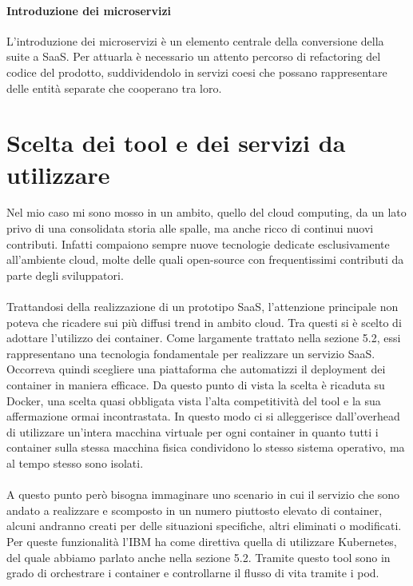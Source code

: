 \paragraph{Introduzione dei microservizi}
L'introduzione dei microservizi è un elemento centrale della conversione della suite a SaaS. Per attuarla è necessario un attento percorso di refactoring del codice del prodotto, suddividendolo in servizi coesi che possano rappresentare delle entità separate che cooperano tra loro.

\section{Scelta dei tool e dei servizi da utilizzare}
Nel mio caso mi sono mosso in un ambito, quello del cloud computing, da un lato privo di una consolidata storia alle spalle, ma anche ricco di continui nuovi contributi. Infatti compaiono sempre nuove tecnologie dedicate esclusivamente all'ambiente cloud, molte delle quali open-source con frequentissimi contributi da parte degli sviluppatori.

\paragraph{}
Trattandosi della realizzazione di un prototipo SaaS, l'attenzione principale non poteva che ricadere sui più diffusi trend in ambito cloud. Tra questi si è scelto di adottare l'utilizzo dei container. Come largamente trattato nella sezione 5.2, essi rappresentano una tecnologia fondamentale per realizzare un servizio SaaS. Occorreva quindi scegliere una piattaforma che automatizzi il deployment dei container in maniera efficace. Da questo punto di vista la scelta è ricaduta su Docker, una scelta quasi obbligata vista l'alta competitività del tool e la sua affermazione ormai incontrastata. In questo modo ci si alleggerisce dall'overhead di utilizzare un'intera macchina virtuale per ogni container in quanto tutti i container sulla stessa macchina fisica condividono lo stesso sistema operativo, ma al tempo stesso sono isolati. 

\paragraph{}
A questo punto però bisogna immaginare uno scenario in cui il servizio che sono andato a realizzare e scomposto in un numero piuttosto elevato di container, alcuni andranno creati per delle situazioni specifiche, altri eliminati o modificati. Per queste funzionalità l'IBM ha come direttiva quella di utilizzare Kubernetes, del quale abbiamo parlato anche nella sezione 5.2. Tramite questo tool sono in grado di orchestrare i container e controllarne il flusso di vita tramite i pod.

